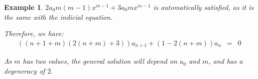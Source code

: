 \documentclass{article}
\newtheorem{example}{Example}[section]
\begin{document}
\begin{enumerate}
\begin{example}
              $2a_{0} m (m-1) x^{m-1} + 3a_{0} m x^{m-1}$ is automatically satisfied,
              as it is the same with the indicial equation.

              Therefore, we have:
              \begin{eqnarray}
                  \left(
                  (n + 1 + m)(2(n + m) + 3)
                  \right) a_{n + 1}
                  + \left(
                  1 - 2(n + m)
                  \right) a_{n} &=& 0
              \end{eqnarray}

              As $m$ has two values, the general solution will depend on $a_0$ and $m$,
              and has a degeneracy of $2$.
          \end{example}
\end{enumerate}
\end{document}
